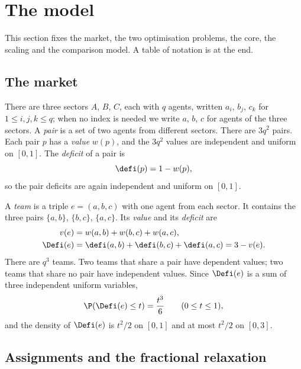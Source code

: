 \section{The model}\label{sec:model}

This section fixes the market, the two optimisation problems, the core, the scaling and the
comparison model. A table of notation is at the end.

\subsection{The market}\label{sec:model-market}

There are three sectors $A$, $B$, $C$, each with $q$ agents, written $a_i$, $b_j$, $c_k$ for
$1\le i,j,k\le q$; when no index is needed we write $a$, $b$, $c$ for agents of the three
sectors. A \emph{pair} is a set of two agents from different sectors. There are $3q^2$ pairs.
Each pair $p$ has a \emph{value} $w(p)$, and the $3q^2$ values are independent and uniform on
$[0,1]$. The \emph{deficit} of a pair is
\begin{equation}\label{eq:model-pairdeficit}
\defi(p)=1-w(p),
\end{equation}
so the pair deficits are again independent and uniform on $[0,1]$.

A \emph{team} is a triple $e=(a,b,c)$ with one agent from each sector. It contains the three
pairs $\{a,b\}$, $\{b,c\}$, $\{a,c\}$. Its \emph{value} and its \emph{deficit} are
\begin{equation}\label{eq:model-teamdeficit}
\begin{aligned}
v(e)&=w(a,b)+w(b,c)+w(a,c),\\
\Defi(e)&=\defi(a,b)+\defi(b,c)+\defi(a,c)=3-v(e).
\end{aligned}
\end{equation}
There are $q^3$ teams. Two teams that share a pair have dependent values; two teams that share
no pair have independent values. Since $\Defi(e)$ is a sum of three independent uniform
variables,
\begin{equation}\label{eq:model-oneteam}
\P(\Defi(e)\le t)=\frac{t^3}{6}\qquad(0\le t\le1),
\end{equation}
and the density of $\Defi(e)$ is $t^2/2$ on $[0,1]$ and at most $t^2/2$ on $[0,3]$.

\subsection{Assignments and the fractional relaxation}\label{sec:model-lp}

